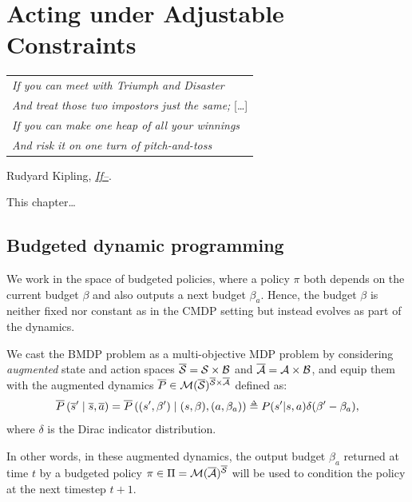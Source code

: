 
\graphicspath{{2-Chapters/5-Chapter/}}

\chapter{Acting under Adjustable Constraints}
\label{chapter:5}

\begin{flushright}
	\begin{tabular}{@{}l@{}}
		\emph{If you can meet with Triumph and Disaster}\\
		\emph{And treat those two impostors just the same;} [\dots]\\
		\emph{If you can make one heap of all your winnings}\\
		\emph{And risk it on one turn of pitch-and-toss}\\
	\end{tabular}

	Rudyard Kipling, \href{https://eleurent.github.io/sisyphe/texts/if-.html}{\emph{If--}}.
\end{flushright}

\abstractStartChapter{}%
This chapter\dots
\minitocStartChapter{}

\section{Budgeted dynamic programming}
\label{sec:bdp}
We work in the space of budgeted policies, where a policy $\pi$ both depends on the current budget $\beta$ and also outputs a next budget $\beta_a$. Hence, the budget $\beta$ is neither fixed nor constant as in the CMDP setting but instead evolves as part of the dynamics.

We cast the BMDP problem as a multi-objective MDP problem \citep{Roijers2013ASO} by considering \emph{augmented} state and action spaces $\overline{\mathcal{S}} = \mathcal{S}\times \mathcal{B}$ and $\overline{\mathcal{A}}= \mathcal{A}\times \mathcal{B}$, and equip them with the augmented dynamics $\overline{P}\in \mathcal{M}(\overline{\mathcal{S}})^{\overline{\mathcal{S}} \times \overline{\mathcal{A}}}$ defined as:
\begin{equation}
\label{eq:augmented-dynamics}
\ov{P}\left(\os' \condbar \os, \oa\right) = \ov{P}\left((s',\beta') \condbar (s,\beta), (a, \beta_a)\right) \eqdef P(s'|s, a)\delta(\beta' - \beta_a),
\end{equation}
where $\delta$ is the Dirac indicator distribution.

In other words, in these augmented dynamics, the output budget $\beta_a$ returned at time $t$ by a budgeted policy $\pi\in \Pi=\mathcal{M}(\overline{\mathcal{A}})^{\overline{\mathcal{S}}}$ will be used to condition the policy at the next timestep $t+1$.

